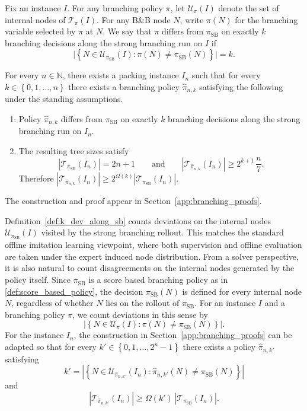 \documentclass[smallextended,envcountsect]{svjour3} %
\newcommand{\N}{\mathbb{N}}
\newcommand{\set}[1]{\left\{#1\right\}}
\newcommand{\U}{\mathcal{U}}
\newcommand{\Tcal}{\mathcal{T}}
\newcommand{\0}{\mathbf{0}}
\newcommand{\1}{\mathbf{1}} %
\begin{document}
\begin{definition}\label{def:k_dev_along_sb}
	Fix an instance $I$.
	For any branching policy $\pi$, let $\U_{\pi}(I)$ denote the set of internal nodes of $\Tcal_{\pi}(I)$.
	For any B\&B node $N$, write $\pi(N)$ for the branching variable selected by $\pi$ at $N$.
	We say that $\pi$ differs from $\pi_{\mathrm{SB}}$ on exactly $k$ branching decisions along the strong branching run on $I$ if
	\[
		\bigl|\set{N\in\U_{\pi_{\mathrm{SB}}}(I): \pi(N)\neq \pi_{\mathrm{SB}}(N)}\bigr|=k.
	\]
\end{definition}

\begin{theorem}\label{thm:k_deviation_linear_gap}
		For every $n\in\N$, there exists a packing instance $I_n$ such that for every $k\in\set{0,1,\dots,n}$ there exists a branching policy $\hat\pi_{n,k}$ satisfying the following under the standing assumptions.
			\begin{enumerate}
				\item Policy $\hat\pi_{n,k}$ differs from $\pi_{\mathrm{SB}}$ on exactly $k$ branching decisions along the strong branching run on $I_n$.
				\item The resulting tree sizes satisfy
				      \[
					      |\Tcal_{\pi_{\mathrm{SB}}}(I_n)| = 2n+1
					      \qquad\text{and}\qquad
					      |\Tcal_{\hat\pi_{n,k}}(I_n)| \ge 2^{k+1}\,\frac{n}{7}.
				      \]
				      Therefore $|\Tcal_{\hat\pi_{n,k}}(I_n)| \ge 2^{\Omega(k)}|\Tcal_{\pi_{\mathrm{SB}}}(I_n)|$.
			\end{enumerate}
	\end{theorem}
The construction and proof appear in Section~\ref{app:branching_proofs}.

Definition~\ref{def:k_dev_along_sb} counts deviations on the internal nodes $\U_{\pi_{\mathrm{SB}}}(I)$ visited by the strong branching rollout.
This matches the standard offline imitation learning viewpoint, where both supervision and offline evaluation are taken under the expert induced node distribution.
From a solver perspective, it is also natural to count disagreements on the internal nodes generated by the policy itself.
Since $\pi_{\mathrm{SB}}$ is a score based branching policy as in \cref{def:score_based_policy}, the decision $\pi_{\mathrm{SB}}(N)$ is defined for every internal node $N$, regardless of whether $N$ lies on the rollout of $\pi_{\mathrm{SB}}$.
For an instance $I$ and a branching policy $\pi$, we count deviations in this sense by
\[
	\left|\set{N\in\U_{\pi}(I): \pi(N)\neq \pi_{\mathrm{SB}}(N)}\right|.
\]
For the instance $I_n$, the construction in Section~\ref{app:branching_proofs} can be adapted so that for every $k'\in\set{0,1,\dots,2^n-1}$ there exists a policy $\hat\pi_{n,k'}$ satisfying
\[
	k'=\left|\set{N\in\U_{\hat\pi_{n,k'}}(I_n): \hat\pi_{n,k'}(N)\neq \pi_{\mathrm{SB}}(N)}\right|
\]
and
\[
	|\Tcal_{\hat\pi_{n,k'}}(I_n)|
	\ge
	\Omega\!\left(k'\right)\,
	|\Tcal_{\pi_{\mathrm{SB}}}(I_n)|.
\]
\end{document}
